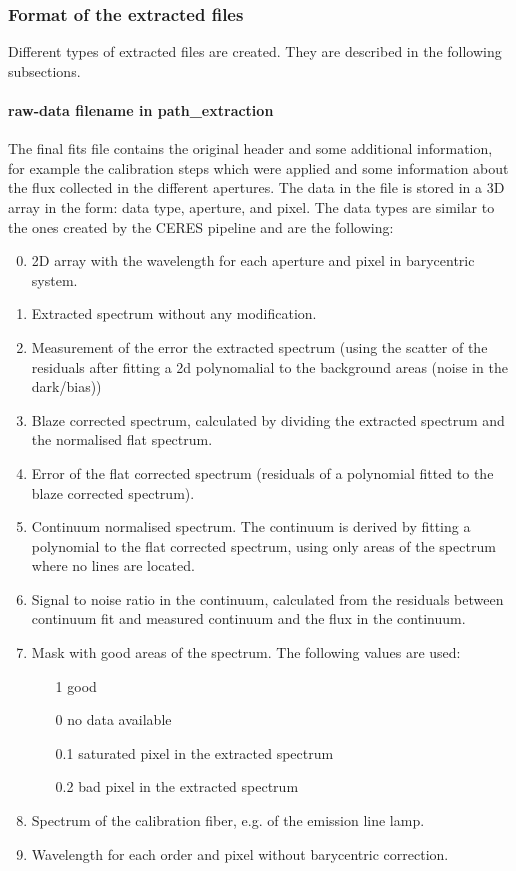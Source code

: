 \documentclass[10pt,a4paper]{article}
\begin{document}
\subsubsection{Format of the extracted files}
Different types of extracted files are created. They are described in the following subsections.

\paragraph{raw-data filename in path\_extraction}
\label{section:extraction_data_format}
The final fits file contains the original header and some additional information, for example the calibration steps which were applied and some information about the flux collected in the different apertures. The data in the file is stored in a 3D array in the form: data type, aperture, and pixel. The data types are similar to the ones created by the CERES pipeline and are the following:
\begin{enumerate}
  \setcounter{enumi}{-1}
  \item 2D array with the wavelength for each aperture and pixel in barycentric system.
  \item Extracted spectrum without any modification.
  \item Measurement of the error the extracted spectrum (using the scatter of the residuals after fitting a 2d polynomalial to the background areas (noise in the dark/bias))
  \item Blaze corrected spectrum, calculated by dividing the extracted spectrum and the normalised flat spectrum.
  \item Error of the flat corrected spectrum (residuals of a polynomial fitted to the blaze corrected spectrum).
  \item Continuum normalised spectrum. The continuum is derived by fitting a polynomial to the flat corrected spectrum, using only areas of the spectrum where no lines are located. 
  \item Signal to noise ratio in the continuum, calculated from the residuals between continuum fit and measured continuum and the flux in the continuum.
  \item Mask with good areas of the spectrum. The following values are used:
  \begin{itemize}
    \item[1] good
    \item[0] no data available
    \item[0.1] saturated pixel in the extracted spectrum
    \item[0.2] bad pixel in the extracted spectrum
  \end{itemize}
  \item Spectrum of the calibration fiber, e.g. of the emission line lamp.
  \item Wavelength for each order and pixel without barycentric correction.
\end{enumerate}
\end{document}
